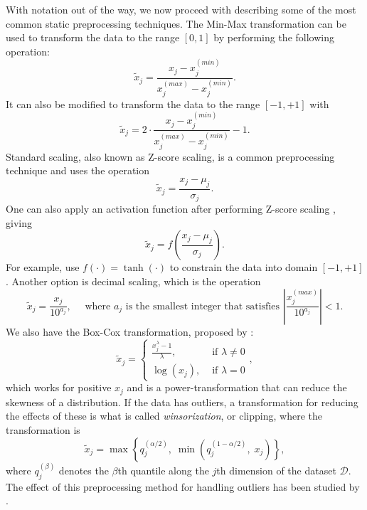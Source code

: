 \documentclass{statsmsc}
\begin{document}
{With notation out of the way, we now proceed with describing some of the most common
static preprocessing techniques.  The Min-Max transformation can be
used to transform the data to the range $[0, 1]$ by performing the following operation:
\begin{equation}\label{eq:pp1}
    \tilde{x}_j = \frac{x_j-x_j^{(min)}}{x_j^{(max)}-x_j^{(min)}} .
\end{equation}
It can also be modified to transform the data to the range $[-1,+1]$ with
\begin{equation}\label{eq:pp2}
    \tilde{x}_j = 2\cdot\frac{x_j-x_j^{(min)}}{x_j^{(max)}-x_j^{(min)}}-1.
\end{equation}
Standard scaling, also known as Z-score scaling, is a common preprocessing technique and
uses the operation
\begin{equation}\label{eq:pp3}
    \tilde{x}_j=\frac{x_j-\mu_j}{\sigma_j}.
\end{equation}
One can also apply an activation function after performing Z-score scaling \citep{nawi},
giving
\begin{equation}\label{eq:pp4}
    \tilde{x}_j=f\left(\frac{x_j-\mu_j}{\sigma_j}\right).
\end{equation}
For example, \cite{mixture_ct} use $f(\cdot)=\tanh(\cdot)$ to constrain the data into domain $[-1,+1]$.
Another option is decimal scaling, which is the operation
\begin{equation}\label{eq:pp5}
    \tilde{x}_j=\frac{x_j}{10^{a_j}}, \quad \textrm{ where } a_j
    \textrm{ is the smallest integer that satisfies }
        \left|\frac{x_j^{(max)}}{10^{a_j}}  \right|<1.
\end{equation}
We also have the Box-Cox transformation, proposed by \cite{boxcox}:
\begin{equation}\label{eq:pp6}
    \tilde{x}_j=\left\{
        \begin{array}{ll}
            \frac{x_j^\lambda-1}{\lambda}, & \textrm{ if } \lambda \neq 0 \\
            \log(x_j), & \textrm{ if } \lambda=0
        \end{array}
    \right.,
\end{equation}
which works for positive $x_j$ and is a power-transformation that can reduce the skewness of
a distribution.  If the data has outliers, a transformation for reducing the effects of these
is what is called \textit{winsorization}, or clipping,
where the transformation is
\begin{equation}\label{eq:pp7}
    \tilde{x}_j=\max\left\{q_j^{(\alpha/2)},\;\min\left(q_j^{(1-\alpha/2)},\; x_j\right)\right\},
\end{equation}
where $q_j^{(\beta)}$ denotes the $\beta$th quantile along the $j$th dimension of the dataset
$\mathcal{D}$. The effect of this preprocessing method for handling outliers has been
studied by \cite{winsorization}.

}
\end{document}
